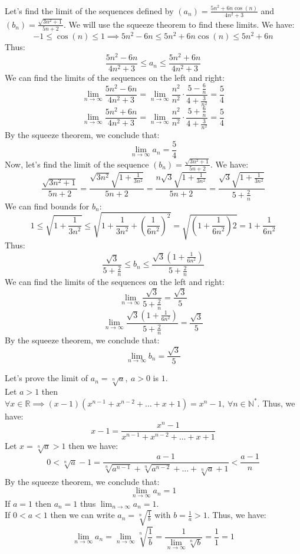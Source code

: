 \begin{eg}
    Let's find the limit of the sequences defined by $(a_n) = \frac{5n^2 + 6n \cos (n)}{4n^2 + 3}$ and $(b_n) = \frac{\sqrt{3n^2 + 1}}{5n + 2}$. We will use the squeeze theorem to find these limits. We have:
    \[ -1 \leq \cos(n) \leq 1 \implies 5n^2 - 6n \leq 5n^2 + 6n \cos(n) \leq 5n^2 + 6n \]
    Thus:
    \[ \frac{5n^2 - 6n}{4n^2 + 3} \leq a_n \leq \frac{5n^2 + 6n}{4n^2 + 3} \]
    We can find the limits of the sequences on the left and right:
    \[ \lim_{n \to \infty} \frac{5n^2 - 6n}{4n^2 + 3} = \lim_{n \to \infty} \frac{n^2}{n^2} \cdot \frac{5 - \frac{6}{n}}{4 + \frac{3}{n^2}} = \frac{5}{4} \]
    \[ \lim_{n \to \infty} \frac{5n^2 + 6n}{4n^2 + 3} = \lim_{n \to \infty} \frac{n^2}{n^2} \cdot \frac{5 + \frac{6}{n}}{4 + \frac{3}{n^2}} = \frac{5}{4} \]
    By the squeeze theorem, we conclude that:
    \[ \lim_{n \to \infty} a_n = \frac{5}{4} \]
    Now, let's find the limit of the sequence \( (b_n) = \frac{\sqrt{3n^2 + 1}}{5n + 2} \). We have:
    \[
        \frac{\sqrt{3n^2 + 1}}{5n + 2} = \frac{\sqrt{3n^2} \sqrt{1 + \frac{1}{3n^2}}}{5n + 2} = \frac{n \sqrt{3} \sqrt{1 + \frac{1}{3n^2}}}{5n + 2} = \frac{\sqrt{3} \sqrt{1 + \frac{1}{3n^2}}}{5 + \frac{2}{n}}
    \]
    We can find bounds for \( b_n \):
    \[
        1 \leq \sqrt{1 + \frac{1}{3n^2}} \leq \sqrt{1 + \frac{1}{3n^2} + (\frac{1}{6n^2})^2} = \sqrt{(1 + \frac{1}{6n^2})2} = 1 + \frac{1}{6n^2}
    \]
    Thus:
    \[ \frac{\sqrt{3}}{5 + \frac{2}{n}} \leq b_n \leq \frac{\sqrt{3}(1 + \frac{1}{6n^2})}{5 + \frac{2}{n}} \]
    We can find the limits of the sequences on the left and right:
    \[ \lim_{n \to \infty} \frac{\sqrt{3}}{5 + \frac{2}{n}} = \frac{\sqrt{3}}{5} \]
    \[ \lim_{n \to \infty} \frac{\sqrt{3}(1 + \frac{1}{6n^2})}{5 + \frac{2}{n}} = \frac{\sqrt{3}}{5} \]
    By the squeeze theorem, we conclude that:
    \[ \lim_{n \to \infty} b_n = \frac{\sqrt{3}}{5} \]
\end{eg}

\begin{eg}
    Let's prove the limit of $a_n = \sqrt[n]{a}, \ a > 0$ is $1$. \\
    Let $a > 1$ then $\forall x \in \mathbb{R} \implies (x-1)(x^{n-1} + x^{n-2} + \ldots + x + 1) = x^n -1, \ \forall n \in \mathbb{N}^*$. Thus, we have:
    \[
        x-1 = \frac{x^n - 1}{x^{n-1} + x^{n-2} + \ldots + x + 1}
    \]
    Let $x = \sqrt[n]{a} > 1$ then we have:
    \[
        0 < \sqrt[n]{a} - 1 = \frac{a - 1}{\sqrt[n]{a^{n-1}} + \sqrt[n]{a^{n-2}} + \ldots + \sqrt[n]{a} + 1} < \frac{a - 1}{n}
    \]
    By the squeeze theorem, we conclude that:
    \[ \lim_{n \to \infty} a_n = 1 \]
    If $a = 1$ then $a_n = 1$ thus $\lim_{n \to \infty} a_n = 1$. \\
    If $0 < a < 1$ then we can write $a_n = \sqrt[n]{\frac{1}{b}}$ with $b = \frac{1}{a} > 1$. Thus, we have:
    \[ \lim_{n \to \infty} a_n = \lim_{n \to \infty} \sqrt[n]{\frac{1}{b}} = \frac{1}{\lim_{n \to \infty} \sqrt[n]{b}} = \frac{1}{1} = 1 \]
\end{eg}

